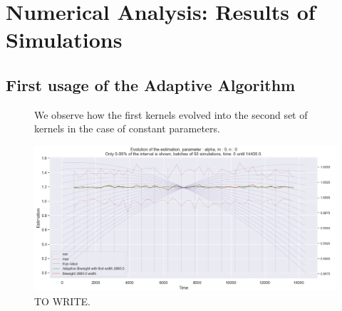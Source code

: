 \chapter{Numerical Analysis: Results of Simulations}


\section{First usage of the Adaptive Algorithm}


\begin{figure}
\centering
{} 
\caption{We observe how the first kernels evolved into the second set of kernels in the case of constant parameters.}
\label{fig:compar_kernels_0}
\end{figure}


\begin{figure}
\centering
\includegraphics[width = 0.90 \textwidth]{../imag/chap3/0/A.png}
\caption{TO WRITE.}
\label{fig:first_estimate_0_alpha}
\end{figure}

